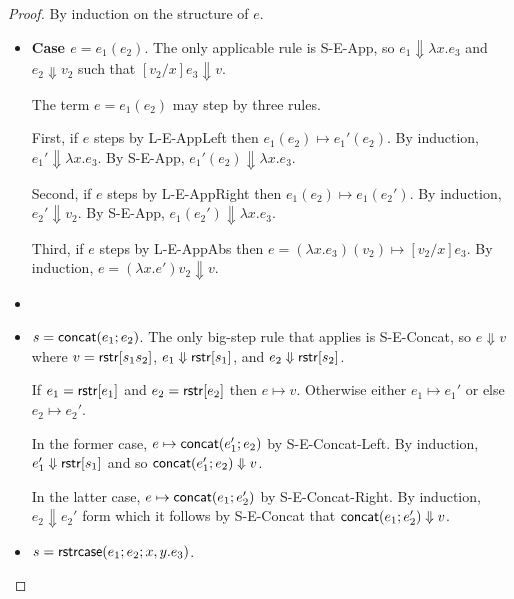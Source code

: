 \documentclass[11pt,leqno]{article}
\theoremstyle{definition}
\newcommand{\strcase}[3]{ {\sf rstrcase}(#1; #2; #3)}
\newcommand{\sreduces}{ \Downarrow }
\begin{document}
\begin{proof}
By induction on the structure of $e$.

\begin{itemize}[label=$ $,itemsep=1ex]


\item \textbf{Case $e = e_1(e_2)$}.
The only applicable rule is S-E-App, so $e_1 \sreduces \lambda x . e_3$
and $e_2 \sreduces v_2$ such that $[v_2/x] e_3 \sreduces v$.

The term $e = e_1(e_2)$ may step by three rules.

First, if $e$ steps by L-E-AppLeft then $e_1(e_2) \mapsto e_1'(e_2)$.
By induction, $e_1' \sreduces \lambda x . e_3$.
By S-E-App, $e_1'(e_2) \sreduces \lambda x . e_3$.

Second, if $e$ steps by L-E-AppRight then $e_1(e_2) \mapsto e_1(e_2')$.
By induction, $e_2' \sreduces v_2$.
By S-E-App, $e_1(e_2') \sreduces \lambda x . e_3$.

Third, if $e$ steps by L-E-AppAbs then $e = (\lambda x . e_3)(v_2) \mapsto [v_2 / x]e_3$.
By induction, $e = (\lambda x . e')v_2 \sreduces v$.

\item {}

\item \textbf{$s = {\sf concat}(e_1;e_2)$}.
The only big-step rule that applies is S-E-Concat,
so $e \sreduces v$ where $v = {\sf rstr}[s_1s_2]$,
$e_1 \sreduces \rstr{s_1}$, and $e_2 \sreduces \rstr{s_2}$.

If $e_1 = {\sf rstr}[e_1]$ and $e_2 = {\sf rstr}[e_2]$ then $e \mapsto v$.
Otherwise either $e_1 \mapsto e_1'$ or else $e_2 \mapsto e_2'$.

In the former case, $e \mapsto {\sf concat}(e_1';e_2)$ by S-E-Concat-Left.
By induction, $e_1' \sreduces \rstr{s_1}$ and so 
$\concat{e_1'}{e_2} \sreduces v$. 

In the latter case, $e \mapsto {\sf concat}(e_1;e_2')$ by S-E-Concat-Right.
By induction, $e_2 \sreduces e_2'$ form which it follows by S-E-Concat
that $\concat{e_1}{e_2'} \sreduces v$.

\item \textbf{$s = \strcase{e_1}{e_2}{x,y.e_3}$}.


\end{itemize}
\end{proof}
\end{document}

